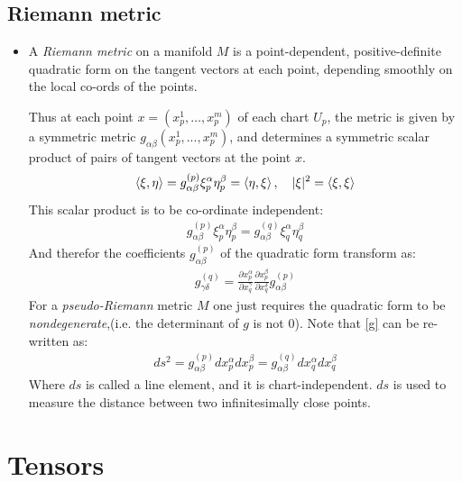 \documentclass[11pt]{article}
\numberwithin{equation}{section}
\begin{document}
\subsection{Riemann metric}
\begin{itemize}
  \item A \emph{Riemann metric} on a manifold $M$ is a point-dependent, positive-definite quadratic form on the tangent vectors at each point, depending smoothly on the local co-ords of the points. 

  Thus at each point $x = (x^{1}_{p},\ldots,x^{m}_p)$ of each chart $U_{p}$, the metric is given by a symmetric metric $g_{\alpha\beta}(x^{1}_{p},...,x^{m}_p)$, and determines a symmetric scalar product of pairs of tangent vectors at the point $x$. 
  \begin{align*}
     \braket{\xi, \eta}  = g_{\alpha\beta}^{(p)}\xi^{\alpha}_{p}\eta^{\beta}_{p} = \braket{\eta,\xi}, ~~~ |\xi|^2 = \braket{\xi,\xi}
   \end{align*} 
   This scalar product is to be co-ordinate independent:
   \begin{align*}
     g_{\alpha\beta}^{(p)}\xi^{\alpha}_{p}\eta^{\beta}_{p} = g_{\alpha\beta}^{(q)}\xi^{\alpha}_{q}\eta^{\beta}_{q}
   \end{align*}
   And therefor the coefficients $g_{\alpha\beta}^{(p)}$ of the quadratic form transform as:
   \begin{align}
   \label{g}
     g_{\gamma\delta}^{(q)}  = \frac{\partial x^{\alpha}_{p}}{\partial x^{\gamma}_{q}}\frac{\partial x^{\beta}_p}{\partial x^{\delta}_{q}}g_{\alpha\beta}^{(p)} 
   \end{align}
   For a \emph{pseudo-Riemann} metric $M$ one just requires the quadratic form to be \emph{nondegenerate},(i.e. the determinant of $g$ is not 0). Note that \ref{g} can be re-written as:
   \begin{align*}
     ds^2 = g_{\alpha\beta}^{(p)}dx^{\alpha}_{p}dx^{\beta}_{p} =g_{\alpha\beta}^{(q)}dx^{\alpha}_{q}dx^{\beta}_{q}  
   \end{align*}
   Where $ds$ is called a line element, and it is chart-independent. $ds$ is used to measure the distance between two infinitesimally close points. 
\end{itemize}

\newpage 
\section{Tensors}
\end{document}
